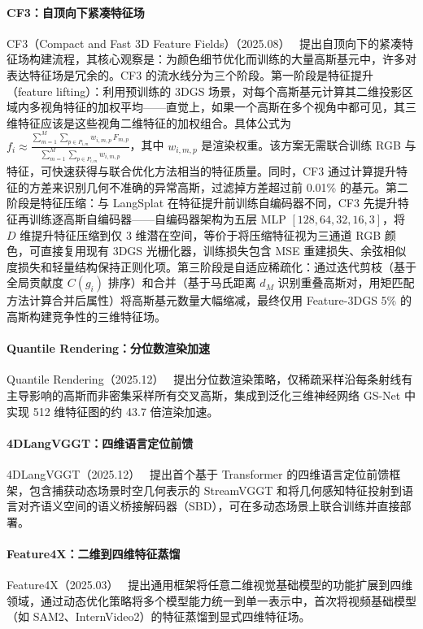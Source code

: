 \paragraph{CF3：自顶向下紧凑特征场} CF3（Compact and Fast 3D Feature Fields）（2025.08）~\cite{2508_05254} 提出自顶向下的紧凑特征场构建流程，其核心观察是：为颜色细节优化而训练的大量高斯基元中，许多对表达特征场是冗余的。CF3 的流水线分为三个阶段。第一阶段是特征提升（feature lifting）：利用预训练的 3DGS 场景，对每个高斯基元计算其二维投影区域内多视角特征的加权平均——直觉上，如果一个高斯在多个视角中都可见，其三维特征应该是这些视角二维特征的加权组合。具体公式为 $f_i \approx \frac{\sum_{m=1}^{M} \sum_{p \in P_{i,m}} w_{i,m,p} \, F_{m,p}}{\sum_{m=1}^{M} \sum_{p \in P_{i,m}} w_{i,m,p}}$，其中 $w_{i,m,p}$ 是渲染权重。该方案无需联合训练 RGB 与特征，可快速获得与联合优化方法相当的特征质量。同时，CF3 通过计算提升特征的方差来识别几何不准确的异常高斯，过滤掉方差超过前 0.01\% 的基元。第二阶段是特征压缩：与 LangSplat 在特征提升前训练自编码器不同，CF3 先提升特征再训练逐高斯自编码器——自编码器架构为五层 MLP $[128, 64, 32, 16, 3]$，将 $D$ 维提升特征压缩到仅 3 维潜在空间，等价于将压缩特征视为三通道 RGB 颜色，可直接复用现有 3DGS 光栅化器，训练损失包含 MSE 重建损失、余弦相似度损失和轻量结构保持正则化项。第三阶段是自适应稀疏化：通过迭代剪枝（基于全局贡献度 $C(g_i)$ 排序）和合并（基于马氏距离 $d_M$ 识别重叠高斯对，用矩匹配方法计算合并后属性）将高斯基元数量大幅缩减，最终仅用 Feature-3DGS 5\% 的高斯构建竞争性的三维特征场。

\paragraph{Quantile Rendering：分位数渲染加速} Quantile Rendering（2025.12）~\cite{2512_20927} 提出分位数渲染策略，仅稀疏采样沿每条射线有主导影响的高斯而非密集采样所有交叉高斯，集成到泛化三维神经网络 GS-Net 中实现 512 维特征图的约 43.7 倍渲染加速。

\paragraph{4DLangVGGT：四维语言定位前馈} 4DLangVGGT（2025.12）~\cite{2512_05060} 提出首个基于 Transformer 的四维语言定位前馈框架，包含捕获动态场景时空几何表示的 StreamVGGT 和将几何感知特征投射到语言对齐语义空间的语义桥接解码器（SBD），可在多动态场景上联合训练并直接部署。

\paragraph{Feature4X：二维到四维特征蒸馏} Feature4X（2025.03）~\cite{2503_20776} 提出通用框架将任意二维视觉基础模型的功能扩展到四维领域，通过动态优化策略将多个模型能力统一到单一表示中，首次将视频基础模型（如 SAM2、InternVideo2）的特征蒸馏到显式四维特征场。

